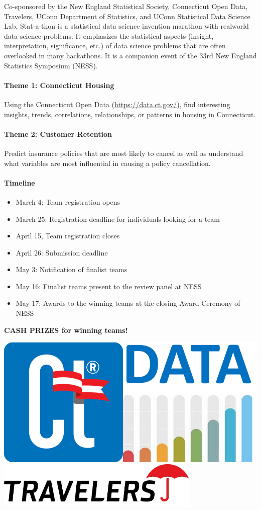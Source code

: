 \documentclass[12pt]{article}
\begin{document}
\begin{large}
Co-sponsored by the New England Statistical Society,
Connecticut Open Data, Travelers,
UConn Department of Statistics, and UConn Statistical Data Science Lab,
Stat-a-thon is a statistical data science invention marathon with
realworld data science problems. It emphasizes the statistical aspects
(insight, interpretation, significance, etc.) of data science problems
that are often overlooked in many hackathons. It is a companion event
of the 33rd New England Statistics Symposium (NESS).


\paragraph{Theme 1: Connecticut Housing}
Using the Connecticut Open Data (\url{https://data.ct.gov/}), find
interesting insights, trends, correlations, relationships, or patterns
in housing in Connecticut.

\paragraph{Theme 2: Customer Retention}
Predict insurance policies that are most likely to cancel as well as
understand what variables are most influential in causing a policy
cancellation.

\paragraph{Timeline}
\begin{itemize}
\item 
  March 4: Team registration opens
\item
  March 25: Registration deadline for individuals looking for a team
\item 
  April 15, Team registration closes
\item
  April 26: Submission deadline
\item
  May 3: Notification of finalist teams
\item
  May 16: Finalist teams present to the review panel at NESS
\item
  May 17: Awards to the winning teams at the closing Award Ceremony of NESS
\end{itemize}

\end{large}

\vfill 

\begin{center}
  {\bf\Large
    CASH PRIZES for winning teams!
  }
\end{center}


\begin{center}
  \includegraphics[width=0.26\linewidth]{ct-data}
  \hfill
\includegraphics[width=0.73\textwidth]{travelers-logo}
\end{center}
\end{document}
